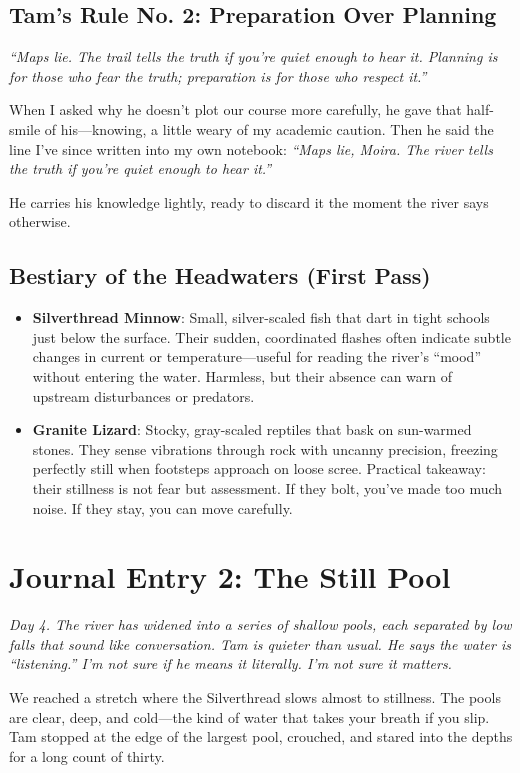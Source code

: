 \documentclass[11pt]{article}
\begin{document}
\subsection*{Tam's Rule No. 2: Preparation Over Planning}
\textit{``Maps lie. The trail tells the truth if you're quiet enough to hear it. Planning is for those who fear the truth; preparation is for those who respect it.''}

When I asked why he doesn't plot our course more carefully, he gave that half-smile of his---knowing, a little weary of my academic caution. Then he said the line I've since written into my own notebook: \textit{``Maps lie, Moira. The river tells the truth if you're quiet enough to hear it.''}

He carries his knowledge lightly, ready to discard it the moment the river says otherwise.

\subsection*{Bestiary of the Headwaters (First Pass)}
\begin{itemize}
    \item \textbf{Silverthread Minnow}: Small, silver-scaled fish that dart in tight schools just below the surface. Their sudden, coordinated flashes often indicate subtle changes in current or temperature---useful for reading the river's ``mood'' without entering the water. Harmless, but their absence can warn of upstream disturbances or predators.
    \item \textbf{Granite Lizard}: Stocky, gray-scaled reptiles that bask on sun-warmed stones. They sense vibrations through rock with uncanny precision, freezing perfectly still when footsteps approach on loose scree. Practical takeaway: their stillness is not fear but assessment. If they bolt, you've made too much noise. If they stay, you can move carefully.
\end{itemize}

\section*{Journal Entry 2: The Still Pool}
\textit{Day 4. The river has widened into a series of shallow pools, each separated by low falls that sound like conversation. Tam is quieter than usual. He says the water is ``listening.'' I'm not sure if he means it literally. I'm not sure it matters.}

We reached a stretch where the Silverthread slows almost to stillness. The pools are clear, deep, and cold---the kind of water that takes your breath if you slip. Tam stopped at the edge of the largest pool, crouched, and stared into the depths for a long count of thirty.
\end{document}
